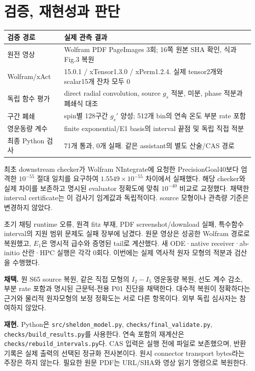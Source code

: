\documentclass[11pt,a4paper]{article}
\numberwithin{equation}{section}
\begin{document}
\newpage
\section{검증, 재현성과 판단}
\begin{center}\begin{tabularx}{\linewidth}{@{}p{43mm}X@{}}\toprule
검증 경로 & 실제 관측 결과\\\midrule
원전 영상 & Wolfram PDF PageImages 3회; 16쪽 원본 SHA 확인, 식과 Fig.3 복원\\
Wolfram/xAct & 15.0.1 / xTensor1.3.0 / xPerm1.2.4. 실제 tensor2개와 scalar15개 잔차 모두 0\\
독립 함수 평가 & direct radial convolution, source $g_s$ 적분, 미분, phase 적분과 폐쇄식 대조\\
구간 폐쇄 & spin별 128구간 $g_s'$ 양성; 512개 bin의 연속 온도 부분 rate 포함\\
영운동량 계수 & finite exponential/E1 basis의 interval 끝점 및 독립 직접 적분\\
최종 Python 검사 & 71개 통과, 0개 실패. 같은 assistant의 별도 산술/CAS 경로\\\bottomrule
\end{tabularx}\end{center}
최초 downstream checker가 Wolfram NIntegrate에 요청한 PrecisionGoal40보다 엄격한 $10^{-55}$ 절대 일치를 요구하여 $1.5549\times10^{-55}$ 차이에서 실패했다. 해당 checker와 실제 차이를 보존하고 명시된 evaluator 정확도에 맞춰 $10^{-40}$ 비교로 교정했다. 채택한 interval certificate는 이 검사기 임계값과 독립적이다. source 모형이나 관측량 기준은 변경하지 않았다.

초기 채팅 runtime 오류, 원격 fitz 부재, PDF screenshot/download 실패, 특수함수 interval의 지원 범위 문제도 실패 장부에 남겼다. 원문 영상은 성공한 Wolfram 경로로 복원했고, $E_1$은 명시적 급수와 증명된 tail로 계산했다. 새 ODE·native receiver·ab-initio 산란·HPC 실행은 각각 0회다. 이번에는 실제 역사적 원자 모형의 적분과 검산을 수행했다.

\textbf{채택.} 원 S65 source 복원, 같은 직접 모형의 $I_2-I_5$ 영운동량 복원, 선도 계수 감소, 부분 rate 포함과 명시된 근문턱-전용 P01 진단을 채택한다. 대수적 복원이 정확하다는 근거와 물리적 원자모형의 보정 정확도는 서로 다른 항목이다. 외부 독립 심사자는 참여하지 않았다.

\textbf{재현.} Python은 \texttt{src/sheldon\_model.py}, \texttt{checks/final\_validate.py}, \texttt{checks/build\_results.py}를 사용한다. 연속 포함의 재계산은 \texttt{checks/rebuild\_intervals.py}다. CAS 입력은 실행 전에 파일로 보존했으며, 반환 기록은 실제 출력의 선택된 정규화 전사본이다. 원시 connector transport bytes라는 주장은 하지 않는다. 필요한 원문 PDF는 URL/SHA와 영상 읽기 명령으로 복원한다.
\end{document}
